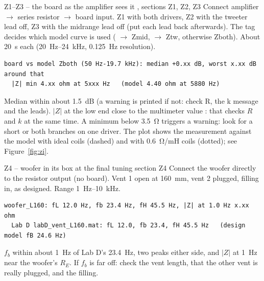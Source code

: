 \documentclass[a4paper,10pt]{article}
\newcommand{\file}[1]{\texttt{\detokenize{#1}}}
\newcommand{\cmd}[1]{\texttt{\detokenize{#1}}}
\begin{document}
\begin{runbox}{Z1--Z3 -- the board as the amplifier sees it \hfill \normalfont\file{zinf_run.m}, sections Z1, Z2, Z3}
Connect amplifier $\to$ series resistor $\to$ board input. Z1 with both drivers, Z2 with the tweeter
lead off, Z3 with the midrange lead off (put each lead back afterwards). The tag decides which model curve
is used (\file{mid} $\to$ Zmid, \file{tw} $\to$ Ztw, otherwise Zboth). About \SI{20}{s} each
(\SI{20}{Hz}--\SI{24}{kHz}, \SI{0.125}{Hz} resolution).
\begin{checkbox}
\begin{Verbatim}[fontsize=\footnotesize]
board vs model Zboth (50 Hz-19.7 kHz): median +0.xx dB, worst x.xx dB around that
  |Z| min 4.xx ohm at 5xxx Hz   (model 4.40 ohm at 5880 Hz)
\end{Verbatim}
Median within about \SI{1.5}{dB} (a warning is printed if not: check R, the k message and the leads).
$|Z|$ at the low end close to the multimeter value \cmd{d.Rdc_board}: that checks $R$ and $k$ at the same
time. A minimum below \SI{3.5}{\ohm} triggers a warning: look for a short or both branches on one driver.
The plot shows the measurement against the model with ideal coils (dashed) and with
\SI{0.6}{\ohm/mH} coils (dotted); see Figure~\ref{fig:zi}.
\end{checkbox}
\end{runbox}

\begin{runbox}{Z4 -- woofer in its box at the final tuning \hfill \normalfont section Z4}
Connect the woofer directly to the resistor output (no board). Vent 1 open at \SI{160}{mm}, vent 2
plugged, filling in, as designed. Range \SI{1}{Hz}--\SI{10}{kHz}.
\begin{checkbox}
\begin{Verbatim}[fontsize=\footnotesize]
woofer_L160: fL 12.0 Hz, fb 23.4 Hz, fH 45.5 Hz, |Z| at 1.0 Hz x.xx ohm
  Lab D labD_vent_L160.mat: fL 12.0, fb 23.4, fH 45.5 Hz   (design model fB 24.6 Hz)
\end{Verbatim}
$f_b$ within about \SI{1}{Hz} of Lab D's \SI{23.4}{Hz}, two peaks either side, and $|Z|$ at \SI{1}{Hz} near the
woofer's $R_E$. If $f_b$ is far off: check the vent length, that the other vent is really plugged, and the
filling.
\end{checkbox}
\end{runbox}
\end{document}

